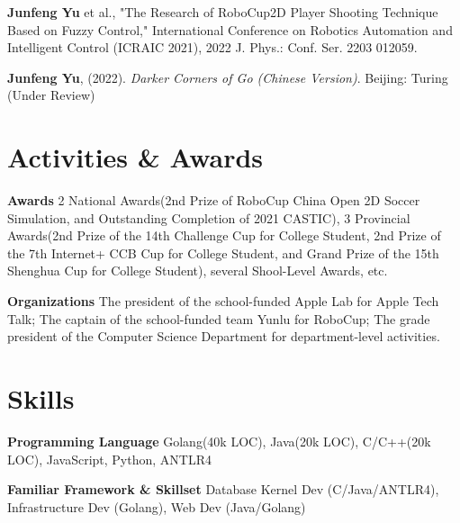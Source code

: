 \documentclass[letterpaper,10pt]{article}
\newcommand{\resumeItem}[2]{
  \item\small{
    \textbf{\:#1}{ #2 \vspace{-4pt}}
  }
}
\begin{document}
    \resumeItem{}{\textbf{Junfeng Yu} et al., "The Research of RoboCup2D Player Shooting Technique Based on Fuzzy Control," International Conference on Robotics Automation and Intelligent Control (ICRAIC 2021), 2022 J. Phys.: Conf. Ser. 2203 012059.}
    
    \resumeItem{}{\textbf{Junfeng Yu}, (2022). \textit{Darker Corners of Go (Chinese Version)}. Beijing: Turing (Under Review)}
    
\vspace{-5pt}
\section{Activities \& Awards}
    
    \resumeItem{Awards}{2 National Awards(2nd Prize of RoboCup China Open 2D Soccer Simulation, and Outstanding Completion of 2021 CASTIC), 3 Provincial Awards(2nd Prize of the 14th Challenge Cup for College Student, 2nd Prize of the 7th Internet+ CCB Cup for College Student, and Grand Prize of the 15th Shenghua Cup for College Student), several Shool-Level Awards, etc.}
    
    
    \resumeItem{Organizations}{The president of the school-funded Apple Lab for Apple Tech Talk; The captain of the school-funded team Yunlu for RoboCup; The grade president of the Computer Science Department for department-level activities.}
        
\vspace{-4pt}
\section{Skills}

  	\resumeItem
      {Programming Language}
      {Golang(40k LOC), Java(20k LOC), C/C++(20k LOC), JavaScript, Python, ANTLR4}
    
    \resumeItem
      {Familiar Framework \& Skillset}
      {Database Kernel Dev (C/Java/ANTLR4), Infrastructure Dev (Golang), Web Dev (Java/Golang)}


\end{document}
